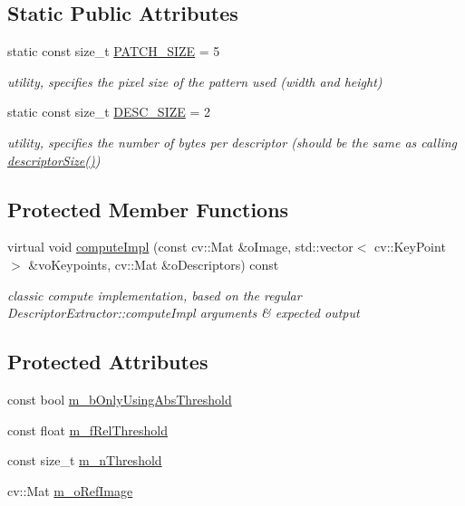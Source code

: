 \subsection*{Static Public Attributes}
\begin{DoxyCompactItemize}
\item 
static const size\+\_\+t \mbox{\hyperlink{class_l_b_s_p_aa98abb79a155d3a2b416c2ab32e74929}{P\+A\+T\+C\+H\+\_\+\+S\+I\+ZE}} = 5
\begin{DoxyCompactList}\small\item\em utility, specifies the pixel size of the pattern used (width and height) \end{DoxyCompactList}\item 
static const size\+\_\+t \mbox{\hyperlink{class_l_b_s_p_a11167130ddc713921e5bbb0b628d5f74}{D\+E\+S\+C\+\_\+\+S\+I\+ZE}} = 2
\begin{DoxyCompactList}\small\item\em utility, specifies the number of bytes per descriptor (should be the same as calling \textquotesingle{}\mbox{\hyperlink{class_l_b_s_p_afc7aa065fa562edd2b16b766910e7806}{descriptor\+Size()}}\textquotesingle{}) \end{DoxyCompactList}\end{DoxyCompactItemize}
\subsection*{Protected Member Functions}
\begin{DoxyCompactItemize}
\item 
virtual void \mbox{\hyperlink{class_l_b_s_p_a1a9b0613104169b3cdf567f7625c7fc4}{compute\+Impl}} (const cv\+::\+Mat \&o\+Image, std\+::vector$<$ cv\+::\+Key\+Point $>$ \&vo\+Keypoints, cv\+::\+Mat \&o\+Descriptors) const
\begin{DoxyCompactList}\small\item\em classic \textquotesingle{}compute\textquotesingle{} implementation, based on the regular Descriptor\+Extractor\+::compute\+Impl arguments \& expected output \end{DoxyCompactList}\end{DoxyCompactItemize}
\subsection*{Protected Attributes}
\begin{DoxyCompactItemize}
\item 
const bool \mbox{\hyperlink{class_l_b_s_p_a5f49537c70502b73f32038218a4f8371}{m\+\_\+b\+Only\+Using\+Abs\+Threshold}}
\item 
const float \mbox{\hyperlink{class_l_b_s_p_a99fbb83c842782bb5621a43efb7580d5}{m\+\_\+f\+Rel\+Threshold}}
\item 
const size\+\_\+t \mbox{\hyperlink{class_l_b_s_p_aa1c90eb308a5ff277df09c4da186693a}{m\+\_\+n\+Threshold}}
\item 
cv\+::\+Mat \mbox{\hyperlink{class_l_b_s_p_a8c5ccb37124c8fa457db0ba9dbe28c18}{m\+\_\+o\+Ref\+Image}}
\end{DoxyCompactItemize}


